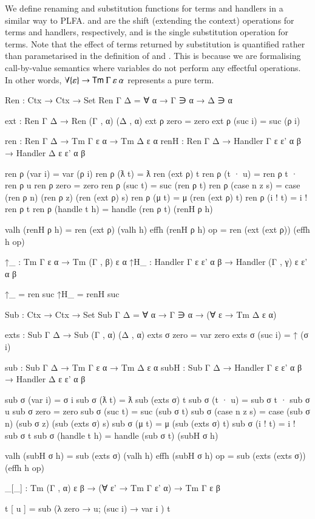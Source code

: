 \documentclass[a4paper,11pt]{article}
\newcommand\fun[1]{{\AgdaFunction{#1}}}
\newcommand\data[1]{{\AgdaFunction{#1}}}
\begin{document}
We define renaming and substitution functions for terms and handlers in a similar way to PLFA.
\fun{↑\_} and \fun{↑H\_} are the shift (extending the context) operations for terms and handlers, respectively, and \fun{\_[\_]} is the single substitution operation for terms.
Note that the effect of terms returned by substitution is quantified rather than parametarised in the definition of \fun{Sub} and \fun{\_[\_]}.
This is because we are formalising call-by-value semantics where variables do not perform any effectful operations.
In other words, $\forall \{\varepsilon\} \rightarrow \data{Tm}\ \Gamma\ \varepsilon\ \alpha$ represents a pure term.
\begin{code}
  Ren : Ctx → Ctx → Set
  Ren Γ Δ = ∀ {α} → Γ ∋ α → Δ ∋ α
\end{code}
\begin{code}[hide]
  ext : Ren Γ Δ → Ren (Γ , α) (Δ , α)
  ext ρ zero = zero
  ext ρ (suc i) = suc (ρ i)

  ren : Ren Γ Δ → Tm Γ ε α → Tm Δ ε α
  renH : Ren Γ Δ → Handler Γ ε ε' α β → Handler Δ ε ε' α β

  ren ρ (var i) = var (ρ i)
  ren ρ (ƛ t) = ƛ ren (ext ρ) t
  ren ρ (t · u) = ren ρ t · ren ρ u
  ren ρ zero = zero
  ren ρ (suc t) = suc (ren ρ t)
  ren ρ (case n z s) = case (ren ρ n) (ren ρ z) (ren (ext ρ) s)
  ren ρ (μ t) = μ (ren (ext ρ) t)
  ren ρ (i ! t) = i ! ren ρ t
  ren ρ (handle t h) = handle (ren ρ t) (renH ρ h)

  valh (renH ρ h) = ren (ext ρ) (valh h)
  effh (renH ρ h) op = ren (ext (ext ρ)) (effh h op)
\end{code}
\begin{code}
  ↑_ : Tm Γ ε α → Tm (Γ , β) ε α
  ↑H_ : Handler Γ ε ε' α β → Handler (Γ , γ) ε ε' α β
\end{code}
\begin{code}[hide]
  ↑_ = ren suc
  ↑H_ = renH suc
\end{code}
\begin{code}
  Sub : Ctx → Ctx → Set
  Sub Γ Δ = ∀ {α} → Γ ∋ α → (∀ {ε} → Tm Δ ε α)
\end{code}
\begin{code}[hide]
  exts : Sub Γ Δ → Sub (Γ , α) (Δ , α)
  exts σ zero = var zero
  exts σ (suc i) = ↑ (σ i)

  sub : Sub Γ Δ → Tm Γ ε α → Tm Δ ε α
  subH : Sub Γ Δ → Handler Γ ε ε' α β → Handler Δ ε ε' α β

  sub σ (var i) = σ i
  sub σ (ƛ t) = ƛ sub (exts σ) t
  sub σ (t · u) = sub σ t · sub σ u
  sub σ zero = zero
  sub σ (suc t) = suc (sub σ t)
  sub σ (case n z s) = case (sub σ n) (sub σ z) (sub (exts σ) s)
  sub σ (μ t) = μ (sub (exts σ) t)
  sub σ (i ! t) = i ! sub σ t
  sub σ (handle t h) = handle (sub σ t) (subH σ h)

  valh (subH σ h) = sub (exts σ) (valh h)
  effh (subH σ h) op = sub (exts (exts σ)) (effh h op)
\end{code}
\begin{code}
  _[_] : Tm (Γ , α) ε β → (∀ {ε'} → Tm Γ ε' α) → Tm Γ ε β
\end{code}
\begin{code}[hide]
  t [ u ] = sub (λ { zero → u; (suc i) → var i }) t
\end{code}
\end{document}
